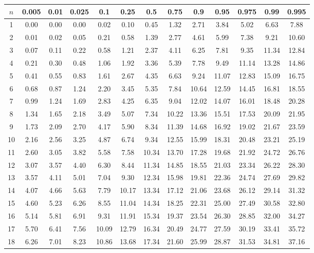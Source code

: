 
\begin{center}
\begin{tabular}{c | c c c c c c c c c c c c}
$n$ & 0.005 & 0.01 & 0.025 & 0.1 & 0.25 & 0.5 & 0.75 & 0.9 & 0.95 & 0.975 & 0.99 & 0.995 \\
\hline
1 & 0.00 & 0.00 & 0.00 & 0.02 & 0.10 & 0.45 & 1.32 & 2.71 & 3.84 & 5.02 & 6.63 & 7.88 \\
2 & 0.01 & 0.02 & 0.05 & 0.21 & 0.58 & 1.39 & 2.77 & 4.61 & 5.99 & 7.38 & 9.21 & 10.60 \\
3 & 0.07 & 0.11 & 0.22 & 0.58 & 1.21 & 2.37 & 4.11 & 6.25 & 7.81 & 9.35 & 11.34 & 12.84 \\
4 & 0.21 & 0.30 & 0.48 & 1.06 & 1.92 & 3.36 & 5.39 & 7.78 & 9.49 & 11.14 & 13.28 & 14.86 \\
5 & 0.41 & 0.55 & 0.83 & 1.61 & 2.67 & 4.35 & 6.63 & 9.24 & 11.07 & 12.83 & 15.09 & 16.75 \\
6 & 0.68 & 0.87 & 1.24 & 2.20 & 3.45 & 5.35 & 7.84 & 10.64 & 12.59 & 14.45 & 16.81 & 18.55 \\
7 & 0.99 & 1.24 & 1.69 & 2.83 & 4.25 & 6.35 & 9.04 & 12.02 & 14.07 & 16.01 & 18.48 & 20.28 \\
8 & 1.34 & 1.65 & 2.18 & 3.49 & 5.07 & 7.34 & 10.22 & 13.36 & 15.51 & 17.53 & 20.09 & 21.95 \\
9 & 1.73 & 2.09 & 2.70 & 4.17 & 5.90 & 8.34 & 11.39 & 14.68 & 16.92 & 19.02 & 21.67 & 23.59 \\
10 & 2.16 & 2.56 & 3.25 & 4.87 & 6.74 & 9.34 & 12.55 & 15.99 & 18.31 & 20.48 & 23.21 & 25.19 \\
11 & 2.60 & 3.05 & 3.82 & 5.58 & 7.58 & 10.34 & 13.70 & 17.28 & 19.68 & 21.92 & 24.72 & 26.76 \\
12 & 3.07 & 3.57 & 4.40 & 6.30 & 8.44 & 11.34 & 14.85 & 18.55 & 21.03 & 23.34 & 26.22 & 28.30 \\
13 & 3.57 & 4.11 & 5.01 & 7.04 & 9.30 & 12.34 & 15.98 & 19.81 & 22.36 & 24.74 & 27.69 & 29.82 \\
14 & 4.07 & 4.66 & 5.63 & 7.79 & 10.17 & 13.34 & 17.12 & 21.06 & 23.68 & 26.12 & 29.14 & 31.32 \\
15 & 4.60 & 5.23 & 6.26 & 8.55 & 11.04 & 14.34 & 18.25 & 22.31 & 25.00 & 27.49 & 30.58 & 32.80 \\
16 & 5.14 & 5.81 & 6.91 & 9.31 & 11.91 & 15.34 & 19.37 & 23.54 & 26.30 & 28.85 & 32.00 & 34.27 \\
17 & 5.70 & 6.41 & 7.56 & 10.09 & 12.79 & 16.34 & 20.49 & 24.77 & 27.59 & 30.19 & 33.41 & 35.72 \\
18 & 6.26 & 7.01 & 8.23 & 10.86 & 13.68 & 17.34 & 21.60 & 25.99 & 28.87 & 31.53 & 34.81 & 37.16 \\

\end{tabular}
\end{center}
